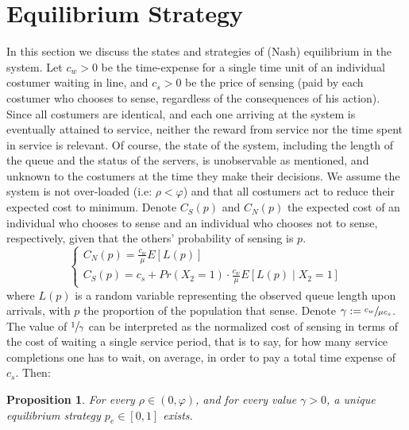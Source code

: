 \documentclass[11pt]{article}
\numberwithin{equation}{section}
\newtheorem{proposition}{Proposition}[section]
\begin{document}
\section{Equilibrium Strategy}
In this section we discuss the states and strategies of (Nash) equilibrium in the system. Let $c_{w}>0$ be the time-expense for a single time unit of an individual costumer waiting in line, and $c_{s}>0$ be the price of sensing (paid by each costumer who chooses to sense, regardless of the consequences of his action). Since all costumers are identical, and each one arriving at the system is eventually attained to service, neither the reward from service nor the time spent in service is relevant. Of course, the state of the system, including the length of the queue and the status of the servers, is unobservable as mentioned, and unknown to the costumers at the time they make their decisions. We assume the system is not over-loaded (i.e: $\rho<\varphi$) and that all costumers act to reduce their expected cost to minimum. Denote $C_{S}(p)$ and $C_{N}(p)$ the expected cost of an individual who chooses to sense and an individual who chooses not to sense, respectively, given that the others' probability of sensing is $p$.
\begin{equation}\begin{cases}
 	C_{N}(p) = \frac{c_{w}}{\mu}E\left[L(p)\right] \\
	C_{S}(p) = c_{s} + Pr(X_2=1) \cdot \frac{c_{w}}{\mu} E\left[L(p)\mid X_{2}=1\right] 
\end{cases}
\label{LossFunc}
\end{equation}
where $L(p)$ is a random variable representing the observed queue length upon arrivals, with $p$ the proportion of the population that sense. Denote $\gamma :=\sfrac{c_{w}}{\mu c_{s}}$. The value of $\sfrac{1}{\gamma}$ can be interpreted as the normalized cost of sensing in terms of the cost of waiting a single service period, that is to say, for how many service completions one has to wait, on average, in order to pay a total time expense of $c_{s}$. Then:

\begin{proposition} For every $\rho\in(0,\varphi)$, and for every value $\gamma>0$, a unique equilibrium strategy $p_{e}\in[0,1]$ exists.
\end{proposition}
\end{document}
